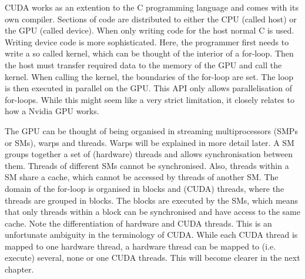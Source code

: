 CUDA works as an extention to the C programming language and comes with its own compiler.
Sections of code are distributed to either the CPU (called host) or the GPU (called device).
When only writing code for the host normal C is used.
Writing device code is more sophisticated.
Here, the programmer first needs to write a so called kernel, which can be thought of the interior of a for-loop.
Then the host must transfer required data to the memory of the GPU and call the kernel.
When calling the kernel, the boundaries of the for-loop are set.
The loop is then executed in parallel on the GPU.
This API only allows parallelisation of for-loops.
While this might seem like a very strict limitation, it closely relates to how a Nvidia GPU works.

The GPU can be thought of being organised in streaming multiprocessors (SMPs or SMs), warps and threads.
Warps will be explained in more detail later.
A SM groups together a set of (hardware) threads and allows synchronisation between them.
Threads of different SMs cannot be synchronised.
Also, threads within a SM share a cache, which cannot be accessed by threads of another SM.
The domain of the for-loop is organised in blocks and (CUDA) threads, where the threads are grouped in blocks.
The blocks are executed by the SMs, which means that only threads within a block can be synchronised and have access to the same cache.
Note the differentiation of hardware and CUDA threads.
This is an unfortunate ambiguity in the terminology of CUDA.
While each CUDA thread is mapped to one hardware thread, a hardware thread can be mapped to (i.e. execute) several, none or one CUDA threads.
This will become clearer in the next chapter.
